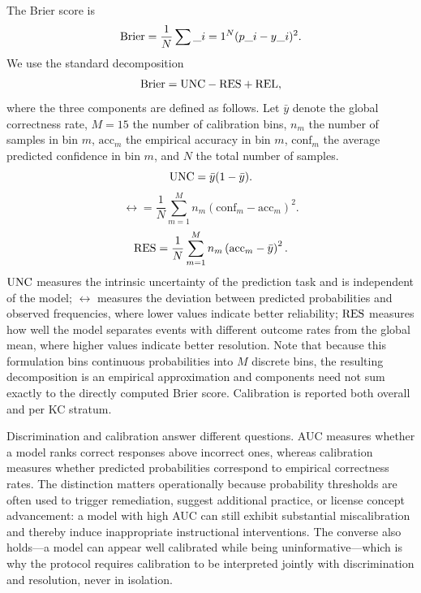 The Brier score is
\begin{equation}
\mathrm{Brier} = \frac{1}{N}\sum\_{i=1}^{N}(p\_i-y\_i)^2.
\end{equation}
We use the standard decomposition
\begin{equation}
\mathrm{Brier} = \mathrm{UNC} - \mathrm{RES} + \mathrm{REL},
\end{equation}
where the three components are defined as follows. Let $\bar{y}$ denote the global correctness rate, $M=15$ the number of calibration bins, $n_m$ the number of samples in bin $m$, $\mathrm{acc}_m$ the empirical accuracy in bin $m$, $\mathrm{conf}_m$ the average predicted confidence in bin $m$, and $N$ the total number of samples.
\begin{equation}
\mathrm{UNC} = \bar{y}(1-\bar{y}).
\end{equation}
\begin{equation}
\rel = \frac{1}{N}\sum_{m=1}^{M} n_m
\left(\mathrm{conf}_m - \mathrm{acc}_m\right)^2.
\end{equation}
\begin{equation}
\mathrm{RES} = \frac{1}{N}\sum_{m=1}^{M} n_m
\left(\mathrm{acc}_m - \bar{y}\right)^2.
\end{equation}
$\mathrm{UNC}$ measures the intrinsic uncertainty of the prediction task and is independent of the model; $\rel$ measures the deviation between predicted probabilities and observed frequencies, where lower values indicate better reliability; $\mathrm{RES}$ measures how well the model separates events with different outcome rates from the global mean, where higher values indicate better resolution. Note that because this formulation bins continuous probabilities into $M$ discrete bins, the resulting decomposition is an empirical approximation and components need not sum exactly to the directly computed Brier score.
Calibration is reported both overall and per KC stratum.

Discrimination and calibration answer different questions. AUC measures whether a model ranks correct responses above incorrect ones, whereas calibration measures whether predicted probabilities correspond to empirical correctness rates. The distinction matters operationally because probability thresholds are often used to trigger remediation, suggest additional practice, or license concept advancement: a model with high AUC can still exhibit substantial miscalibration and thereby induce inappropriate instructional interventions. The converse also holds---a model can appear well calibrated while being uninformative---which is why the protocol requires calibration to be interpreted jointly with discrimination and resolution, never in isolation.

